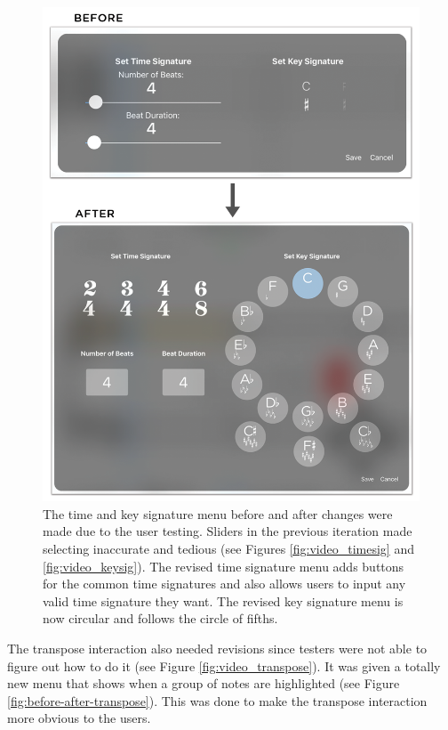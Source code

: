 				\begin{figure}[H]
					\centering
					\includegraphics[scale=0.34]{figures/before-after-tsmenu}
				    \caption{The time and key signature menu before and after changes were made due to the user testing. Sliders in the previous iteration made selecting inaccurate and tedious (see Figures \ref{fig:video_timesig} and \ref{fig:video_keysig}). The revised time signature menu adds buttons for the common time signatures and also allows users to input any valid time signature they want. The revised key signature menu is now circular and follows the circle of fifths.}
				    \label{fig:before-after-tsmenu}
				\end{figure} 

				The transpose interaction also needed revisions since testers were not able to figure out how to do it (see Figure \ref{fig:video_transpose}). It was given a totally new menu that shows when a group of notes are highlighted (see Figure \ref{fig:before-after-transpose}). This was done to make the transpose interaction more obvious to the users.

